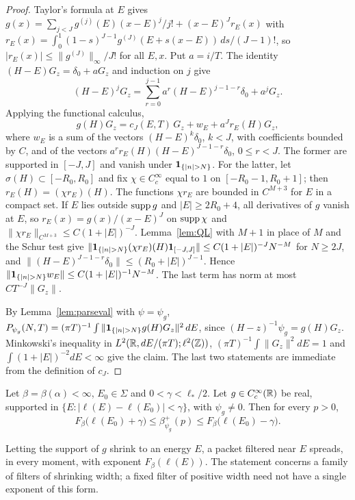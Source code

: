 \begin{proof}
Taylor's formula at $E$ gives $g(x)=\sum_{j<J}g^{(j)}(E)(x-E)^j/j!+(x-E)^Jr_E(x)$ with $r_E(x)=\int_0^1(1-s)^{J-1}g^{(J)}(E+s(x-E))\,ds/(J-1)!$, so $|r_E(x)|\le\|g^{(J)}\|_\infty/J!$ for all $E,x$. Put $a=i/T$. The identity $(H-E)G_z=\delta_0+aG_z$ and induction on $j$ give
\[
(H-E)^jG_z=\sum_{r=0}^{j-1}a^r(H-E)^{j-1-r}\delta_0+a^jG_z .
\]
Applying the functional calculus,
\[
g(H)G_z=c_J(E,T)\,G_z+w_E+a^Jr_E(H)G_z,
\]
where $w_E$ is a sum of the vectors $(H-E)^k\delta_0$, $k<J$, with coefficients bounded by $C$, and of the vectors $a^rr_E(H)(H-E)^{J-1-r}\delta_0$, $0\le r<J$. The former are supported in $[-J,J]$ and vanish under $\un_{\{|n|>N\}}$. For the latter, let $\sigma(H)\subset[-R_0,R_0]$ and fix $\chi\in C_c^\infty$ equal to $1$ on $[-R_0-1,R_0+1]$; then $r_E(H)=(\chi r_E)(H)$. The functions $\chi r_E$ are bounded in $C^{M+3}$ for $E$ in a compact set. If $E$ lies outside $\operatorname{supp} g$ and $|E|\ge2R_0+4$, all derivatives of $g$ vanish at $E$, so $r_E(x)=g(x)/(x-E)^J$ on $\operatorname{supp}\chi$ and $\|\chi r_E\|_{C^{M+3}}\le C(1+|E|)^{-J}$. Lemma~\ref{lem:QL} with $M+1$ in place of $M$ and the Schur test give $\|\un_{\{|n|>N\}}(\chi r_E)(H)\un_{[-J,J]}\|\le C(1+|E|)^{-J}N^{-M}$ for $N\ge2J$, and $\|(H-E)^{J-1-r}\delta_0\|\le(R_0+|E|)^{J-1}$. Hence $\|\un_{\{|n|>N\}}w_E\|\le C(1+|E|)^{-1}N^{-M}$. The last term has norm at most $CT^{-J}\|G_z\|$.

By Lemma~\ref{lem:parseval} with $\psi=\psi_g$, $P_{\psi_g}(N,T)=(\pi T)^{-1}\int\|\un_{\{|n|>N\}}g(H)G_z\|^2\,dE$, since $(H-z)^{-1}\psi_g=g(H)G_z$. Minkowski's inequality in $L^2(\mathbb R,dE/(\pi T);\ell^2(\mathbb Z))$, $(\pi T)^{-1}\int\|G_z\|^2dE=1$ and $\int(1+|E|)^{-2}dE<\infty$ give the claim. The last two statements are immediate from the definition of $c_J$.
\end{proof}

\begin{theorem}\label{thm:U3}
Let $\beta=\beta(\alpha)<\infty$, $E_0\in\Sigma$ and $0<\gamma<\ell_*/2$. Let $g\in C_c^\infty(\mathbb R)$ be real, supported in $\{E:|\ell(E)-\ell(E_0)|<\gamma\}$, with $\psi_g\ne0$. Then for every $p>0$,
\[
F_\beta\bigl(\ell(E_0)+\gamma\bigr)\le\beta^+_{\psi_g}(p)\le F_\beta\bigl(\ell(E_0)-\gamma\bigr).
\]
\end{theorem}

Letting the support of $g$ shrink to an energy $E$, a packet filtered near $E$ spreads, in every moment, with exponent $F_\beta(\ell(E))$. The statement concerns a family of filters of shrinking width; a fixed filter of positive width need not have a single exponent of this form.

